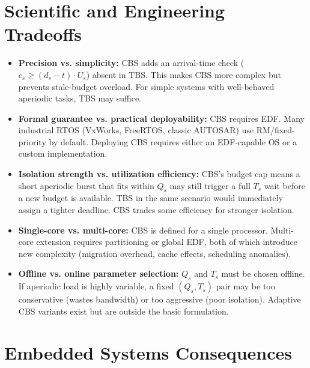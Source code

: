 \documentclass[conference]{IEEEtran}
\begin{document}
\section{Scientific and Engineering Tradeoffs}

\begin{itemize}
  \item \textbf{Precision vs. simplicity:} CBS adds an arrival-time
        check ($c_s \geq (d_s - t) \cdot U_s$) absent in TBS. This
        makes CBS more complex but prevents stale-budget overload. For
        simple systems with well-behaved aperiodic tasks, TBS may
        suffice.
  \item \textbf{Formal guarantee vs. practical deployability:} CBS
        requires EDF. Many industrial RTOS (VxWorks, FreeRTOS, classic
        AUTOSAR) use RM/fixed-priority by default. Deploying CBS
        requires either an EDF-capable OS or a custom implementation.
  \item \textbf{Isolation strength vs. utilization efficiency:} CBS's
        budget cap means a short aperiodic burst that fits within $Q_s$
        may still trigger a full $T_s$ wait before a new budget is
        available. TBS in the same scenario would immediately assign a
        tighter deadline. CBS trades some efficiency for stronger
        isolation.
  \item \textbf{Single-core vs. multi-core:} CBS is defined for a
        single processor. Multi-core extension requires partitioning or
        global EDF, both of which introduce new complexity (migration
        overhead, cache effects, scheduling anomalies).
  \item \textbf{Offline vs. online parameter selection:} $Q_s$ and
        $T_s$ must be chosen offline. If aperiodic load is highly
        variable, a fixed $(Q_s, T_s)$ pair may be too conservative
        (wastes bandwidth) or too aggressive (poor isolation). Adaptive
        CBS variants exist but are outside the basic formulation.
\end{itemize}

\section{Embedded Systems Consequences}
\end{document}

